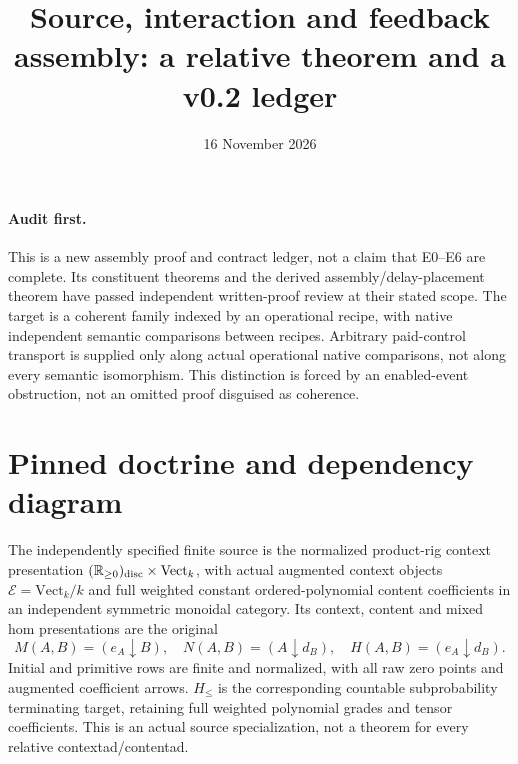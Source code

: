 \documentclass[11pt]{article}
\title{Source, interaction and feedback assembly: a relative theorem and a v0.2 ledger}
\date{16 November 2026}
\begin{document}
\maketitle
\paragraph{Audit first.} This is a new assembly proof and contract ledger, not a claim that E0--E6 are complete. Its constituent theorems and the derived assembly/delay-placement theorem have passed independent written-proof review at their stated scope. The target is a coherent family indexed by an operational recipe, with native independent semantic comparisons between recipes. Arbitrary paid-control transport is supplied only along actual operational native comparisons, not along every semantic isomorphism. This distinction is forced by an enabled-event obstruction, not an omitted proof disguised as coherence.

\section{Pinned doctrine and dependency diagram}
The independently specified finite source is the normalized product-rig
context presentation $(\mathbb R_{\geq0})_{\rm disc}\times\mathrm{Vect}_k$,
with actual augmented context objects $\mathcal E=\mathrm{Vect}_k/k$ and
full weighted constant ordered-polynomial content coefficients in an
independent symmetric monoidal category. Its context, content and mixed
hom presentations are the original
\[
 M(A,B)=(e_A\downarrow B),\quad N(A,B)=(A\downarrow d_B),\quad
 H(A,B)=(e_A\downarrow d_B).
\]
Initial and primitive rows are finite and normalized, with all raw zero
points and augmented coefficient arrows. $H_{\leq}$ is the corresponding
countable subprobability terminating target, retaining full weighted
polynomial grades and tensor coefficients. This is an actual source
specialization, not a theorem for every relative contextad/contentad.
\end{document}
